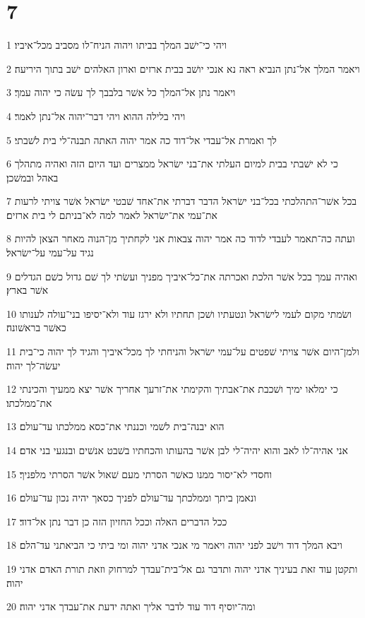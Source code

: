 \chapter{7}

\par 1 ויהי כי־ישׁב המלך בביתו ויהוה הניח־לו מסביב מכל־איביו׃
\par 2 ויאמר המלך אל־נתן הנביא ראה נא אנכי יושׁב בבית ארזים וארון האלהים ישׁב בתוך היריעה׃
\par 3 ויאמר נתן אל־המלך כל אשׁר בלבבך לך עשׂה כי יהוה עמך׃
\par 4 ויהי בלילה ההוא ויהי דבר־יהוה אל־נתן לאמר׃
\par 5 לך ואמרת אל־עבדי אל־דוד כה אמר יהוה האתה תבנה־לי בית לשׁבתי׃
\par 6 כי לא ישׁבתי בבית למיום העלתי את־בני ישׂראל ממצרים ועד היום הזה ואהיה מתהלך באהל ובמשׁכן׃
\par 7 בכל אשׁר־התהלכתי בכל־בני ישׂראל הדבר דברתי את־אחד שׁבטי ישׂראל אשׁר צויתי לרעות את־עמי את־ישׂראל לאמר למה לא־בניתם לי בית ארזים׃
\par 8 ועתה כה־תאמר לעבדי לדוד כה אמר יהוה צבאות אני לקחתיך מן־הנוה מאחר הצאן להיות נגיד על־עמי על־ישׂראל׃
\par 9 ואהיה עמך בכל אשׁר הלכת ואכרתה את־כל־איביך מפניך ועשׂתי לך שׁם גדול כשׁם הגדלים אשׁר בארץ׃
\par 10 ושׂמתי מקום לעמי לישׂראל ונטעתיו ושׁכן תחתיו ולא ירגז עוד ולא־יסיפו בני־עולה לענותו כאשׁר בראשׁונה׃
\par 11 ולמן־היום אשׁר צויתי שׁפטים על־עמי ישׂראל והניחתי לך מכל־איביך והגיד לך יהוה כי־בית יעשׂה־לך יהוה׃
\par 12 כי ימלאו ימיך ושׁכבת את־אבתיך והקימתי את־זרעך אחריך אשׁר יצא ממעיך והכינתי את־ממלכתו׃
\par 13 הוא יבנה־בית לשׁמי וכננתי את־כסא ממלכתו עד־עולם׃
\par 14 אני אהיה־לו לאב והוא יהיה־לי לבן אשׁר בהעותו והכחתיו בשׁבט אנשׁים ובנגעי בני אדם׃
\par 15 וחסדי לא־יסור ממנו כאשׁר הסרתי מעם שׁאול אשׁר הסרתי מלפניך׃
\par 16 ונאמן ביתך וממלכתך עד־עולם לפניך כסאך יהיה נכון עד־עולם׃
\par 17 ככל הדברים האלה וככל החזיון הזה כן דבר נתן אל־דוד׃
\par 18 ויבא המלך דוד וישׁב לפני יהוה ויאמר מי אנכי אדני יהוה ומי ביתי כי הביאתני עד־הלם׃
\par 19 ותקטן עוד זאת בעיניך אדני יהוה ותדבר גם אל־בית־עבדך למרחוק וזאת תורת האדם אדני יהוה׃
\par 20 ומה־יוסיף דוד עוד לדבר אליך ואתה ידעת את־עבדך אדני יהוה׃
